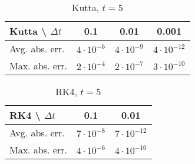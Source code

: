 \message{ !name(../journal.tex)}\documentclass[a4paper,12pt]{article}
\begin{document}
\begin{table}[h]
  \caption{Kutta, $t = 5$}
  \label{tab:kutta-lyapunov-error-rk4-ref}
  \centering
  \begin{tabular}[h]{l|c|c|c}
    \hline
    Kutta \textbackslash\hspace{0.5em} $\Delta{t}$& 0.1 & 0.01 & 0.001 \\
    \hline
    Avg. abs. err. & $4 \cdot 10^{-6}$ & $4 \cdot 10^{-9} $ & $4 \cdot 10^{-12}$ \\
    Max. abs. err. & $2 \cdot 10^{-4}$ & $2 \cdot 10^{-7}$ & $3 \cdot 10^{-10} $ \\
    \hline
  \end{tabular}
\end{table}

\begin{table}[h]
  \caption{RK4, $t = 5$}
  \label{tab:RK4-lyapunov-error-rk4-ref}
  \centering
  \begin{tabular}[h]{l|c|c}
    \hline
    RK4 \textbackslash\hspace{0.5em} $\Delta{t}$& 0.1 & 0.01 \\
    \hline
    Avg. abs. err. & $7 \cdot 10^{-8}$ & $7 \cdot 10^{-12} $ \\
    Max. abs. err. & $4 \cdot 10^{-6}$ & $4 \cdot 10^{-10}$ \\
    \hline
  \end{tabular}
\end{table}




\end{document}
